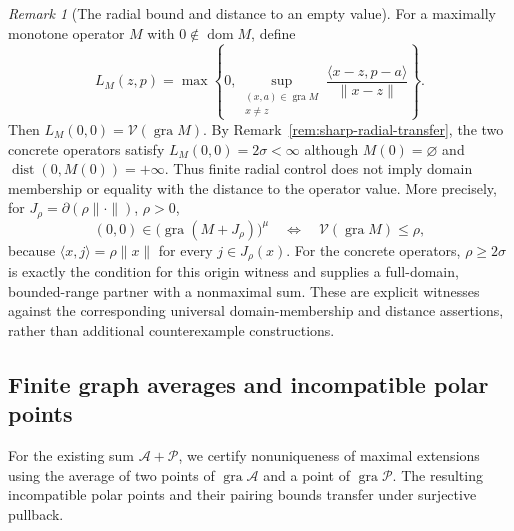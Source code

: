 \documentclass[11pt]{article}
\newcommand{\gra}{\operatorname{gra}}
\newcommand{\dom}{\operatorname{dom}}
\newcommand{\pair}[2]{\langle #1,#2\rangle}
\theoremstyle{definition}
\theoremstyle{remark}
\newtheorem{remark}{Remark}
\newcommand{\dist}{\operatorname{dist}}
\begin{document}
\begin{remark}[The radial bound and distance to an empty value]
\label{rem:radial-distance-recovered}
For a maximally monotone operator $M$ with $0\notin\dom M$, define
\[
L_M(z,p)=\max\left\{0,\sup_{\substack{(x,a)\in\gra M\\x\ne z}}\frac{\pair{x-z}{p-a}}{\|x-z\|}\right\}.
\]
Then $L_M(0,0)=\mathcal V(\gra M)$. By Remark~\ref{rem:sharp-radial-transfer}, the two concrete operators satisfy $L_M(0,0)=2\sigma<\infty$ although $M(0)=\varnothing$ and $\dist(0,M(0))=+\infty$. Thus finite radial control does not imply domain membership or equality with the distance to the operator value. More precisely, for $J_\rho=\partial(\rho\|\cdot\|)$, $\rho>0$,
\[
(0,0)\in\bigl(\gra(M+J_\rho)\bigr)^\mu
\quad\Longleftrightarrow\quad\mathcal V(\gra M)\le\rho,
\]
because $\pair{x}{j}=\rho\|x\|$ for every $j\in J_\rho(x)$. For the concrete operators, $\rho\ge2\sigma$ is exactly the condition for this origin witness and supplies a full-domain, bounded-range partner with a nonmaximal sum. These are explicit witnesses against the corresponding universal domain-membership and distance assertions, rather than additional counterexample constructions.
\end{remark}

\subsection{Finite graph averages and incompatible polar points}
\label{subsec:appendix-graph-averages}

For the existing sum $\mathcal A+\mathcal P$, we certify nonuniqueness of maximal extensions using the average of two points of $\gra\mathcal A$ and a point of $\gra\mathcal P$. The resulting incompatible polar points and their pairing bounds transfer under surjective pullback.
\end{document}
